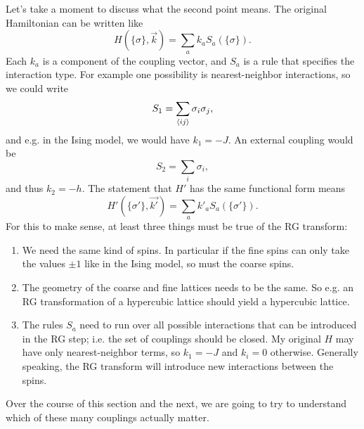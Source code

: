 Let's take a moment to discuss what the second point means. The original Hamiltonian can be
written like
\begin{equation}
H\left(\{\sigma\},\vec{k}\right)=\sum_a k_a S_a\left(\{\sigma\}\right).
\end{equation}
Each $k_a$ is a component of the coupling vector, and $S_a$ is a rule that
specifies the interaction type. For example one possibility is nearest-neighbor
interactions, so we could write
\begin{equation}
S_1=\sum_{\ev{ij}}\sigma_i\sigma_j,
\end{equation}
and e.g. in the Ising model, we would have $k_1=-J$. An external coupling would
be
\begin{equation}
S_2=\sum_{i}\sigma_i,
\end{equation}
and thus $k_2=-h$. The statement that $H'$ has the same functional form means
\begin{equation}
H'\left(\{\sigma'\},\vec{k'}\right)=\sum_a k'_a S_a\left(\{\sigma'\}\right).
\end{equation}
For this to make sense, at least three things must be true of the RG transform:
\begin{enumerate}
\item We need the same kind of spins. In particular if the fine spins can only
take the values $\pm1$ like in the Ising model, so must the coarse spins.
\item The geometry of the coarse and fine lattices needs to be the same. So e.g.
an RG transformation of a hypercubic lattice should yield a hypercubic lattice.
\item The rules $S_a$ need to run over all possible interactions that can be
introduced in the RG step; i.e. the set of couplings should be closed. My
original $H$ may have only nearest-neighbor terms, so $k_1=-J$ and $k_i=0$
otherwise. Generally speaking, the RG transform will introduce new interactions
between the spins.
\end{enumerate}
Over the course of this section and the next, we are going to try to understand
which of these many couplings actually matter.

